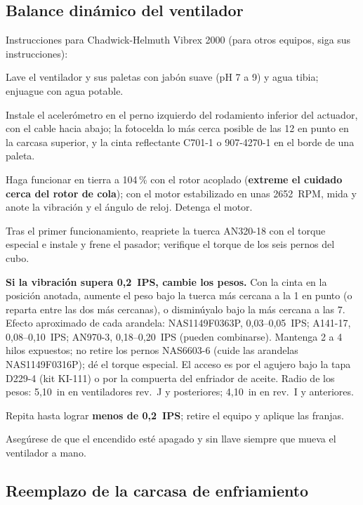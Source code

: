 \subsection{Balance dinámico del ventilador}

Instrucciones para Chadwick-Helmuth Vibrex 2000 (para otros equipos, siga sus instrucciones):

\begin{pasos}
\item Lave el ventilador y sus paletas con jabón suave (pH 7 a 9) y agua tibia; enjuague con agua potable.
\item Instale el acelerómetro en el perno izquierdo del rodamiento inferior del actuador, con el cable hacia abajo; la fotocelda lo más cerca posible de las 12 en punto en la carcasa superior, y la cinta reflectante C701-1 o 907-4270-1 en el borde de una paleta.
\item Haga funcionar en tierra a 104\,\% con el rotor acoplado (\textbf{extreme el cuidado cerca del rotor de cola}); con el motor estabilizado en unas 2652~RPM, mida y anote la vibración y el ángulo de reloj. Detenga el motor.
\item Tras el primer funcionamiento, reapriete la tuerca AN320-18 con el torque especial e instale y frene el pasador; verifique el torque de los seis pernos del cubo.
\item \textbf{Si la vibración supera 0,2~IPS, cambie los pesos.} Con la cinta en la posición anotada, aumente el peso bajo la tuerca más cercana a la 1 en punto (o reparta entre las dos más cercanas), o disminúyalo bajo la más cercana a las 7. Efecto aproximado de cada arandela: NAS1149F0363P, 0,03--0,05~IPS; A141-17, 0,08--0,10~IPS; AN970-3, 0,18--0,20~IPS (pueden combinarse). Mantenga 2 a 4 hilos expuestos; no retire los pernos NAS6603-6 (cuide las arandelas NAS1149F0316P); dé el torque especial. El acceso es por el agujero bajo la tapa D229-4 (kit KI-111) o por la compuerta del enfriador de aceite. Radio de los pesos: 5,10~in en ventiladores rev.~J y posteriores; 4,10~in en rev.~I y anteriores.
\item Repita hasta lograr \textbf{menos de 0,2~IPS}; retire el equipo y aplique las franjas.
\end{pasos}

\begin{precaucion}
Asegúrese de que el encendido esté apagado y sin llave siempre que mueva el ventilador a mano.
\end{precaucion}

\subsection{Reemplazo de la carcasa de enfriamiento}


